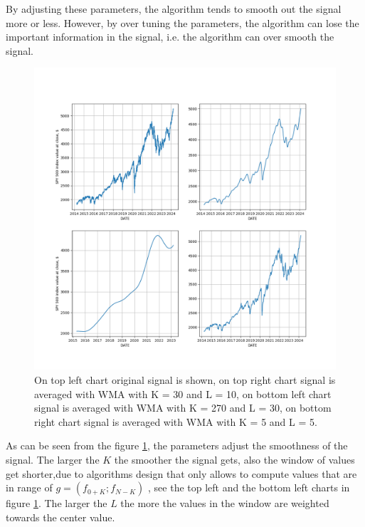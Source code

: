 \documentclass[a4paper,12pt,fleqn]{article}
\begin{document}
                By adjusting these parameters, the algorithm tends to smooth out the signal more or less.
                However, by over tuning the parameters, the algorithm can lose the important information in the signal, i.e.
                the algorithm can over smooth the signal.
                \begin{figure}[ht]
                    \centering
                    \includegraphics[width=1\textwidth]{images/WMA_ex_1.png} %
                    \caption[Short caption for the list of figures]{On top left chart original signal is shown, on top right chart signal is 
                    averaged with WMA with K = 30 and L = 10, on bottom left chart signal is averaged with WMA  with K = 270 and L = 30, on bottom right chart 
                    signal is averaged with WMA  with K = 5 and L = 5.}
                    \label{fig:WMA_ex_1}
                \end{figure}

                As can be seen from the figure \ref{fig:WMA_ex_1}, the parameters adjust the smoothness of the signal. 
                The larger the \begin{math}
                    K
                \end{math} the smoother the signal gets, also the window of values get shorter,due to 
                algorithms design that only allows to compute values that are in range of
                \begin{math}
                    g = (f_{0+K}; f_{N-K})
                \end{math}
                , see the top left and 
                the bottom left charts in figure \ref*{fig:WMA_ex_1}.
                 The larger the \begin{math}
                    L
                \end{math} the more the values in the window are weighted towards the center value.
\end{document}
